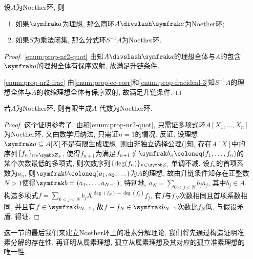 \begin{proposition}\label{prop:noetherring2}
  设$A$为Noether环, 则
  \begin{enumerate}
    \item\label{enum:prop-nr2-quot} 如果$\ideal{a}$为理想, 那么商环$A{\divslash}\ideal{a}$为Noether环;
    \item\label{enum:prop-nr2-frac} 如果$S$为乘法闭集, 那么分式环$S^{-1}A$为Noether环.
  \end{enumerate}
\end{proposition}

\begin{proof}
  \ref{enum:prop-nr2-quot} 由知$A{\divslash}\ideal{a}$的理想全体与$A$的包含$\ideal{a}$的理想全体有保序双射, 故满足升链条件.

  \ref{enum:prop-nr2-frac} 由\ref{enum:prop-ec-corr}和\ref{enum:prop-fracideal-3}知$S^{-1}A$的理想全体与$A$的收缩理想全体有保序双射, 故满足升链条件.
\end{proof}

\begin{theorem}\label{thm:hilbertbasis}
  若$A$为Noether环, 则有限生成$A$-代数为Noether环.
\end{theorem}

\begin{proof}
  这个证明参考了. 由和\ref{enum:prop-nr2-quot}, 只需证多项式环$A[X_1, \dotsc, X_n]$为Noether环. 又由数学归纳法, 只需证$n=1$的情况. 反证, 设理想$\ideal{a}\subseteq A[X]$不是有限生成理想, 则由非独立选择公理()知, 存在$A[X]$中的序列$\{f_n\}_{n\in\ZZ_+}$, 使得$f_{n+1}$为满足$f_{n+1}\notin \ideal{b}_n\coloneq (f_1, \dotsc, f_{n})$的某个次数最低的多项式, 则次数序列$\{\deg(f_n)\}_{n\in\ZZ_+}$单调不减. 设$f_n$的首项系数为$a_n$, 则$\ideal{b}\coloneq (a_1, a_2, \dotsc)$为$A$的理想, 故由升链条件知存在正整数$N>1$使得$\ideal{b}=(a_1, \dotsc, a_{N-1})$, 特别地, $a_N=\sum_{0<j<N}b_ja_j$, 其中$b_j\in A$. 构造多项式$f=\sum_{0<j<N}b_jX^{\deg(f_N)-\deg(f_j)}f_j$, 有$f$与$f_N$次数相同且首项系数相同, 并且有$f\in\ideal{b}_{N-1}$, 故$f-f_N\in\ideal{b}_{N-1}$次数比$f_N$低, 与假设矛盾. 得证.
\end{proof}

这一节的最后我们来建立Noether环上的准素分解理论, 我们将先通过构造证明准素分解的存在性, 再证明从属素理想, 孤立从属素理想及其对应的孤立准素理想的唯一性.

